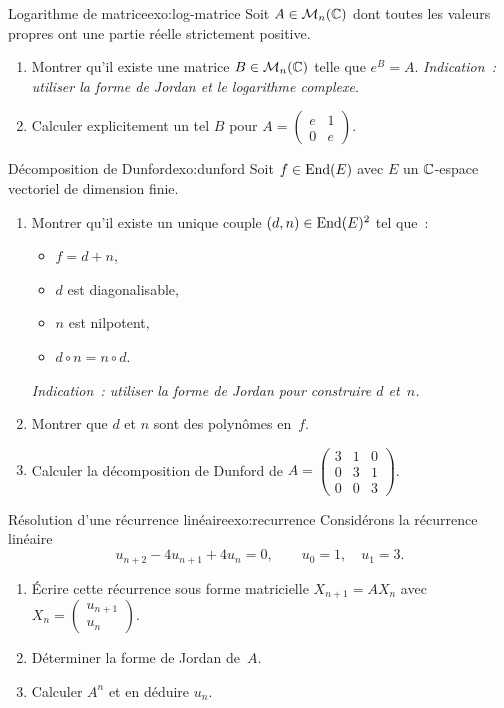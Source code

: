 \begin{exercise}{Logarithme de matrice}{exo:log-matrice}
  \challenging
  Soit $A\in\mathcal{M}_n({\mathbb{C}})$ dont toutes les valeurs propres ont une partie
  réelle strictement positive.
  \begin{enumerate}[label=(\alph*)]
    \item Montrer qu'il existe une matrice $B\in\mathcal{M}_n({\mathbb{C}})$ telle que
      $e^B=A$. \emph{Indication~: utiliser la forme de Jordan et le
      logarithme complexe.}
    \item Calculer explicitement un tel $B$ pour
      $A=\begin{pmatrix}e&1\\0&e\end{pmatrix}$.
  \end{enumerate}
\end{exercise}

\begin{exercise}{Décomposition de Dunford}{exo:dunford}
  \intermediate{}
  Soit $f\in\operatorname{End}(E)$ avec $E$ un ${\mathbb{C}}$-espace vectoriel de dimension
  finie.
  \begin{enumerate}[label=(\alph*)]
    \item Montrer qu'il existe un unique couple $(d,n)\in\operatorname{End}(E)^2$ tel
      que~:
      \begin{itemize}
        \item $f=d+n$,
        \item $d$ est diagonalisable,
        \item $n$ est nilpotent,
        \item $d\circ n=n\circ d$.
      \end{itemize}
      \emph{Indication~: utiliser la forme de Jordan pour construire $d$
      et~$n$.}
    \item Montrer que $d$ et $n$ sont des polynômes en~$f$.
    \item Calculer la décomposition de Dunford de
      $A=\begin{pmatrix}3&1&0\\0&3&1\\0&0&3\end{pmatrix}$.
  \end{enumerate}
\end{exercise}

\begin{exercise}{Résolution d'une récurrence linéaire}{exo:recurrence}
  \intermediate
  Considérons la récurrence linéaire
  \[
    u_{n+2}-4u_{n+1}+4u_n=0,\qquad u_0=1,\quad u_1=3.
  \]
  \begin{enumerate}[label=(\alph*)]
    \item Écrire cette récurrence sous forme matricielle
      $X_{n+1}=AX_n$ avec $X_n=\begin{pmatrix}u_{n+1}\\u_n\end{pmatrix}$.
    \item Déterminer la forme de Jordan de~$A$.
    \item Calculer $A^n$ et en déduire $u_n$.
  \end{enumerate}
\end{exercise}


